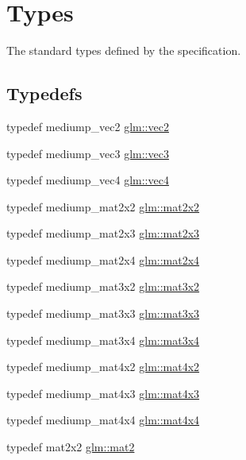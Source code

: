 \hypertarget{group__core__types}{\section{\-Types}
\label{group__core__types}
}


\-The standard types defined by the specification.  


\subsection*{\-Typedefs}
\begin{DoxyCompactItemize}
\item 
typedef mediump\-\_\-vec2 \hyperlink{group__core__types_ga66d091b759687504ab01365fbd33a1dd}{glm\-::vec2}
\item 
typedef mediump\-\_\-vec3 \hyperlink{group__core__types_gad45787527c6ff2bd6680867204eb0354}{glm\-::vec3}
\item 
typedef mediump\-\_\-vec4 \hyperlink{group__core__types_gae9c89157f980f7247cdee8bf55787035}{glm\-::vec4}
\item 
typedef mediump\-\_\-mat2x2 \hyperlink{group__core__types_gac35d9aae8d7beaceba6d18f6e26261a4}{glm\-::mat2x2}
\item 
typedef mediump\-\_\-mat2x3 \hyperlink{group__core__types_gad23070b803932f5f3c9d9c2fd4d64895}{glm\-::mat2x3}
\item 
typedef mediump\-\_\-mat2x4 \hyperlink{group__core__types_gaa78542b8bfa06cd48c53dcd0d0a00707}{glm\-::mat2x4}
\item 
typedef mediump\-\_\-mat3x2 \hyperlink{group__core__types_gae38fe62de819d214ac89f1f4df343844}{glm\-::mat3x2}
\item 
typedef mediump\-\_\-mat3x3 \hyperlink{group__core__types_gae01cfe70eb34df727346f82c7c08acd7}{glm\-::mat3x3}
\item 
typedef mediump\-\_\-mat3x4 \hyperlink{group__core__types_ga75499a515649f0db9593beb23ab084a5}{glm\-::mat3x4}
\item 
typedef mediump\-\_\-mat4x2 \hyperlink{group__core__types_gaf8b375fbef797b3730fcddc7bd60b59f}{glm\-::mat4x2}
\item 
typedef mediump\-\_\-mat4x3 \hyperlink{group__core__types_ga605b649496ad53379e8ac6d7a4534667}{glm\-::mat4x3}
\item 
typedef mediump\-\_\-mat4x4 \hyperlink{group__core__types_gafe3341c717b9f9725019a10fd1dcf9c1}{glm\-::mat4x4}
\item 
typedef mat2x2 \hyperlink{group__core__types_ga8357ec0aab6f8cf69313592492663c3f}{glm\-::mat2}

\end{DoxyCompactItemize}

